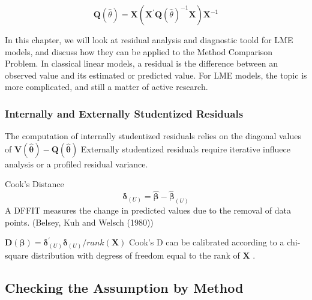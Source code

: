 \documentclass[12pt, a4paper]{report}
\theoremstyle{plain}
\theoremstyle{definition}
\theoremstyle{remark}
\begin{document}
	\[ \boldsymbol{Q} (\hat{\theta}) = \boldsymbol{X} ( \boldsymbol{X}^{\prime}\boldsymbol{Q} (\hat{\theta})^{-1}\boldsymbol{X})\boldsymbol{X}^{-1} \]
	
	

	
	
	
	
	In this chapter, we will look at residual analysis and diagnostic toold for LME models, and discuss how they can be applied to the Method Comparison Problem.	In classical linear models, a residual is the difference between an observed value and its estimated or predicted value. For LME models, the topic is more complicated, and still a matter of active research. 
	
	
	\subsubsection{Internally and Externally Studentized Residuals}
	The computation of internally studentized residuals relies on the diagonal values of $\boldsymbol{V(\hat{\theta})} - \boldsymbol{Q(\hat{\theta})}$
	Externally studentized residuals require iterative influece analysis or a profiled residual variance.
	
	Cook's Distance
	\[ \boldsymbol{\delta}_{(U)} = \boldsymbol{\hat{\beta}}  - \boldsymbol{\hat{\beta}}_{(U)} \]
	A DFFIT measures the change in predicted values due to the removal of data points.
	(Belsey, Kuh and Welsch (1980))
	
	$\boldsymbol{D(\beta)}  = \boldsymbol{\delta}^{\prime}_{(U)} \boldsymbol{\delta}_{(U)} / rank(\boldsymbol{X})$
	Cook's D can be calibrated according to a chi-square distribution with degress of freedom equal to the rank of $\boldsymbol{X}$ \citet{CPJ}.
	
	
	


	\subsection{Checking the Assumption by Method}
	
	
	
	
\end{document}
